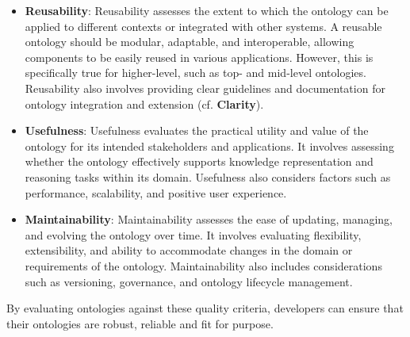 \begin{itemize}
    \item \textbf{Reusability}: Reusability assesses the extent to which the ontology can be applied to different contexts or integrated with other systems. A reusable ontology should be modular, adaptable, and interoperable, allowing components to be easily reused in various applications. However, this is specifically true for higher-level, such as top- and mid-level ontologies. Reusability also involves providing clear guidelines and documentation for ontology integration and extension (cf. \textbf{Clarity}).

    \item \textbf{Usefulness}: Usefulness evaluates the practical utility and value of the ontology for its intended stakeholders and applications. It involves assessing whether the ontology effectively supports knowledge representation and reasoning tasks within its domain. Usefulness also considers factors such as performance, scalability, and positive user experience.

    \item \textbf{Maintainability}: Maintainability assesses the ease of updating, managing, and evolving the ontology over time. It involves evaluating flexibility, extensibility, and ability to accommodate changes in the domain or requirements of the ontology. Maintainability also includes considerations such as versioning, governance, and ontology lifecycle management.
\end{itemize}

By evaluating ontologies against these quality criteria, developers can ensure that their ontologies are robust, reliable and fit for purpose.

